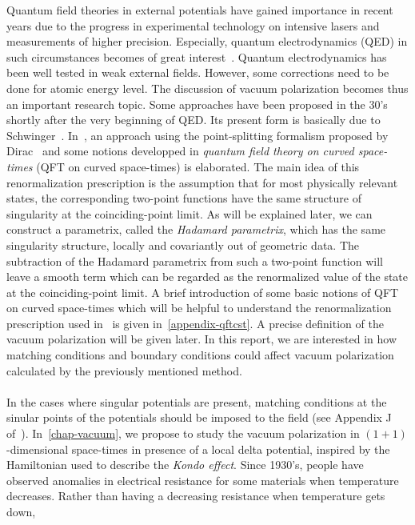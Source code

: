 Quantum field theories in external potentials have gained importance in recent years due to the progress in experimental technology on intensive lasers and measurements of higher precision.
Especially, quantum electrodynamics (QED) in such circumstances becomes of great interest~\cite{Mohr1998}. 
Quantum electrodynamics has been well tested in weak external fields.
However, some corrections need to be done for atomic energy level. 
The discussion of vacuum polarization becomes thus an important research topic. 
Some approaches have been proposed in the 30's shortly after the very beginning of QED.
Its present form is basically due to Schwinger~\cite{Schwinger1951}. 
In~\cite{Zahn2015}, an approach using the point-splitting formalism proposed by Dirac~\cite{Dirac1934} and some notions developped in \textit{quantum field theory on curved space-times} (QFT on curved space-times) is elaborated. 
The main idea of this renormalization prescription is the assumption that for most physically relevant states,
the corresponding two-point functions have the same structure of singularity at the coinciding-point limit. 
As will be explained later, we can construct a parametrix, 
called the \textit{Hadamard parametrix},  
which has the same singularity structure, locally and covariantly out of geometric data. 
The subtraction of the Hadamard parametrix from such a two-point function will leave a smooth term which can be regarded as the renormalized value of the state at the coinciding-point limit.
A brief introduction of some basic notions of QFT on curved space-times which will be helpful to understand the renormalization prescription used in~\cite{Zahn2015} is given in~\cref{appendix-qftcst}.
A precise definition of the vacuum polarization will be given later.
In this report, we are interested in how matching conditions and boundary conditions could affect vacuum polarization calculated by the previously mentioned method. \\\\
%
In the cases where singular potentials are present, 
matching conditions at the sinular points of the potentials should be imposed to the field (see \eg Appendix J of~\cite{albeverio1988solvable}).
In~\cref{chap-vacuum}, we propose to study the vacuum polarization in 
$(1+1)$-dimensional space-times in presence of a local delta potential, inspired by the Hamiltonian used to describe the \textit{Kondo effect}.
Since 1930's, people have observed anomalies in electrical resistance for some materials when temperature decreases. 
Rather than having a decreasing resistance when temperature gets down,
